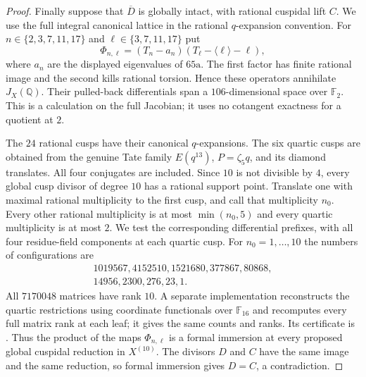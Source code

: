 \begin{proof}
Finally suppose that $\overline D$ is globally intact, with rational
cuspidal lift $C$. We use the full integral canonical lattice in the
rational $q$-expansion convention. For
$n\in\{2,3,7,11,17\}$ and $\ell\in\{3,7,11,17\}$ put
\[
 \Phi_{n,\ell}=(T_n-a_n)(T_\ell-\langle\ell\rangle-\ell),
\]
where $a_n$ are the displayed eigenvalues of $65\mathrm a$.
The first factor has finite rational image and the second kills
rational torsion. Hence these operators annihilate $J_X(\mathbb Q)$.
Their pulled-back differentials span a $106$-dimensional space
over $\mathbb F_2$. This is a calculation on the full Jacobian;
it uses no cotangent exactness for a quotient at $2$.

The $24$ rational cusps have their canonical $q$-expansions. The
six quartic cusps are obtained from the genuine Tate family
$E(q^{13})$, $P=\zeta_5q$, and its diamond translates. All four
conjugates are included. Since $10$ is not divisible by $4$,
every global cusp divisor of degree $10$ has a rational support
point. Translate one with maximal rational multiplicity to the
first cusp, and call that multiplicity $n_0$. Every other rational
multiplicity is at most $\min(n_0,5)$ and every quartic multiplicity
is at most $2$. We test the corresponding differential prefixes,
with all four residue-field components at each quartic cusp.
For $n_0=1,\ldots,10$ the numbers of configurations are
\[
\begin{gathered}
 1019567,4152510,1521680,377867,80868,\\
 14956,2300,276,23,1.
\end{gathered}
\]
All $7170048$ matrices have rank $10$. A separate implementation
reconstructs the quartic restrictions using coordinate functionals
over $\mathbb F_{16}$ and recomputes every full matrix rank at each
leaf; it gives the same counts and ranks. Its certificate is
.
Thus the product of the maps $\Phi_{n,\ell}$ is a formal immersion
at every proposed global cuspidal reduction in $X^{(10)}$.
The divisors $D$ and $C$ have the same image and the same reduction,
so formal immersion gives $D=C$, a contradiction.
\end{proof}
